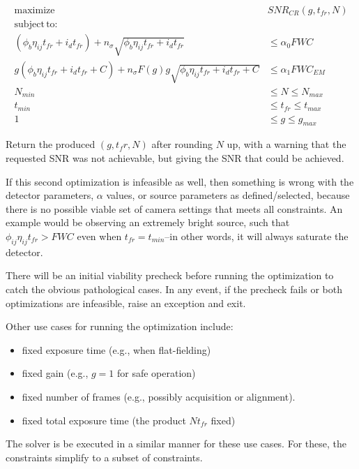 \documentclass{article}
\begin{document}
\begin{align}
\mathrm{maximize}\, & SNR_{CR}\left(g, t_{fr}, N\right) \\
\mathrm{subject\,to:} & \nonumber \\
(\phi_{b} \eta_{ij} t_{fr} + i_{d} t_{fr}) + n_{\sigma} \sqrt{\phi_{b} \eta_{ij} t_{fr} + i_{d} t_{fr}} &\leq \alpha_{0} FWC \\
g(\phi_{b} \eta_{ij} t_{fr} + i_{d} t_{fr} + C) + n_{\sigma} F(g) g \sqrt{\phi_{b} \eta_{ij} t_{fr} + i_{d} t_{fr} + C} &\leq \alpha_{1} FWC_{EM} \\
N_{min} &\leq N \leq N_{max} \\
t_{min} &\leq t_{fr} \leq t_{max} \\
1 &\leq g \leq g_{max}
\end{align}


Return the produced $(g, t_fr, N)$ after rounding $N$ up, with a warning that the requested SNR was not achievable, but giving the SNR that could be achieved.

If this second optimization is infeasible as well, then something is wrong with the detector parameters, $\alpha$ values, or source parameters as defined/selected, because there is no possible viable set of camera settings that meets all constraints.  An example would be observing an extremely bright source, such that $\phi_{ij} \eta_{ij} t_{fr} > FWC$ even when $t_{fr} = t_{min}$--in other words, it will always saturate the detector.

There will be an initial viability precheck before running the optimization to catch the obvious pathological cases.  In any event, if the precheck fails or both optimizations are infeasible, raise an exception and exit.

Other use cases for running the optimization include:
\begin{itemize}
\item fixed exposure time (e.g., when flat-fielding)
\item fixed gain (e.g., $g=1$ for safe operation)
\item fixed number of frames (e.g., possibly acquisition or alignment).
\item fixed total exposure time (the product $N t_{fr}$ fixed)
\end{itemize}
The solver is be executed in a similar manner for these use cases.  For these,
the constraints simplify to a subset of constraints.
\end{document}
